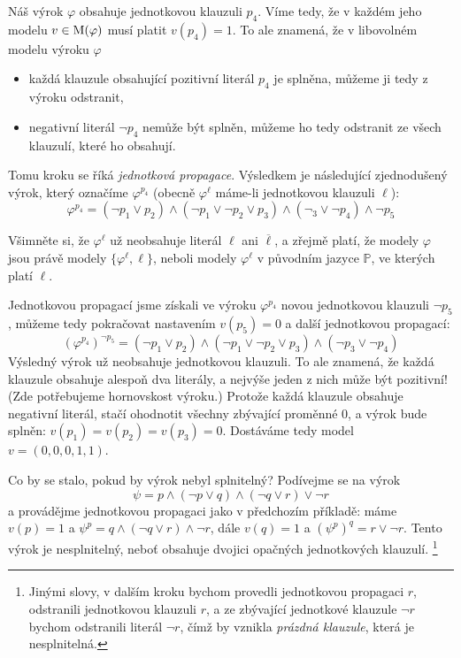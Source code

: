 Náš výrok $\varphi$ obsahuje jednotkovou klauzuli $p_4$. Víme tedy, že v každém jeho modelu $v\in\operatorname{M}(\varphi)$ musí platit $v(p_4)=1$. To ale znamená, že v libovolném modelu výroku $\varphi$
\begin{itemize}
    \item každá klauzule obsahující pozitivní literál $p_4$ je splněna, můžeme ji tedy z výroku odstranit,
    \item negativní literál $\neg p_4$ nemůže být splněn, můžeme ho tedy odstranit ze všech klauzulí, které ho obsahují. 
\end{itemize}
Tomu kroku se říká \emph{jednotková propagace}. Výsledkem je následující zjednodušený výrok, který označíme $\varphi^{p_4}$ (obecně $\varphi^\ell$ máme-li jednotkovou klauzuli $\ell$):
$$
\varphi^{p_4}=(\neg p_1\lor p_2)\land(\neg p_1\lor\neg p_2\lor p_3)\land(\neg _3\lor\neg p_4)\land\neg p_5
$$
\begin{observation}
Všimněte si, že $\varphi^\ell$ už neobsahuje literál $\ell$ ani $\overline{\ell}$, a zřejmě platí, že modely $\varphi$ jsou právě modely $\{\varphi^{\ell},\ell\}$, neboli modely $\varphi^{\ell}$ v původním jazyce $\mathbb P$, ve kterých platí $\ell$.
\end{observation}

Jednotkovou propagací jsme získali ve výroku $\varphi^{p_4}$ novou jednotkovou klauzuli $\neg p_5$, můžeme tedy pokračovat nastavením $v(p_5)=0$ a další jednotkovou propagací:
$$
(\varphi^{p_4})^{\neg p_5}=(\neg p_1\lor p_2)\land(\neg p_1\lor\neg p_2\lor p_3)\land(\neg p_3\lor\neg p_4)
$$
Výsledný výrok už neobsahuje jednotkovou klauzuli. To ale znamená, že každá klauzule obsahuje alespoň dva literály, a nejvýše jeden z nich může být pozitivní! (Zde potřebujeme hornovskost výroku.) Protože každá klauzule obsahuje negativní literál, stačí ohodnotit všechny zbývající proměnné 0, a výrok bude splněn: $v(p_1)=v(p_2)=v(p_3)=0$. Dostáváme tedy model $v=(0,0,0,1,1)$.

\begin{example}
    Co by se stalo, pokud by výrok nebyl splnitelný? Podívejme se na výrok 
    $$
    \psi=p\land (\neg p\lor q)\land (\neg q\lor r)\lor\neg r
    $$ 
    a provádějme jednotkovou propagaci jako v předchozím příkladě: máme $v(p)=1$ a 
$\psi^p=q\land (\neg q\lor r)\land\neg r$, dále $v(q)=1$ a $(\psi^p)^q=r\lor\neg r$. 
Tento výrok je nesplnitelný, neboť obsahuje dvojici opačných jednotkových klauzulí. \footnote{Jinými slovy, v dalším kroku bychom provedli jednotkovou propagaci $r$, odstranili jednotkovou klauzuli $r$, a ze zbývající jednotkové klauzule $\neg r$ bychom odstranili literál $\neg r$, čímž by vznikla \emph{prázdná klauzule}, která je nesplnitelná.}
\end{example}

